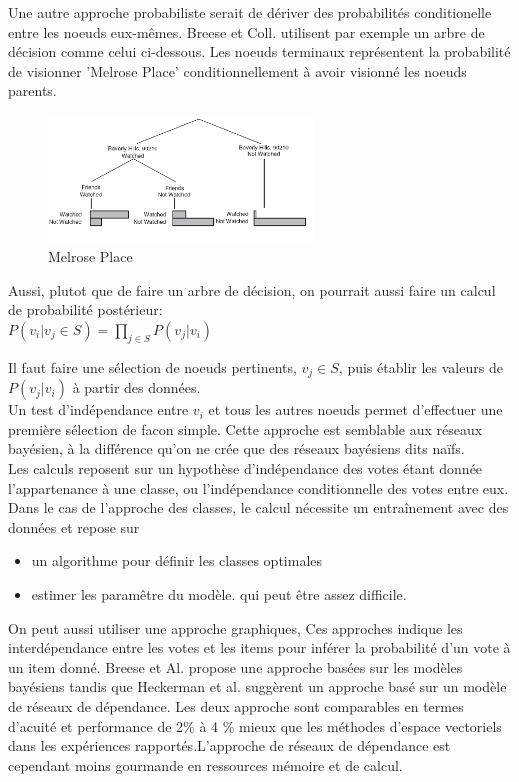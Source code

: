 \documentclass[oneside]{book}
\begin{document}
Une autre approche probabiliste serait de dériver des probabilités conditionelle entre les noeuds eux-mêmes. Breese et Coll. utilisent par exemple un arbre de décision comme celui ci-dessous. Les noeuds terminaux représentent la probabilité de visionner 'Melrose Place' conditionnellement à avoir visionné les noeuds parents.\\

\begin{figure}[!ht]
\centering
\includegraphics[width = 7cm]{decision_tree.png}
\caption{Melrose Place}
\label{fig:decision_tree}
\end{figure}

Aussi, plutot que de faire un arbre de décision, on pourrait aussi faire un calcul de probabilité postérieur:\\

\centering
$P(v_i|v_j\in S) = \prod\limits_{j\in S} P(v_j|v_i)$
\justify

Il faut faire une sélection de noeuds pertinents, $v_j \in S$, puis établir les valeurs de $P(v_j|v_i)$ à partir des données.\\

Un test d'indépendance entre $v_i$ et tous les autres noeuds permet d'effectuer une première sélection de facon simple. Cette approche est semblable aux réseaux bayésien, à la différence qu'on ne crée que des réseaux bayésiens dits naïfs.\\

Les calculs reposent sur un hypothèse d'indépendance des votes étant donnée l'appartenance à une classe, ou l'indépendance conditionnelle des votes entre eux. Dans le cas de l'approche des classes, le calcul nécessite un entraînement avec des données et repose sur 
\begin{itemize}
\item un algorithme pour définir les classes optimales
\item estimer les paramêtre du modèle. qui peut être assez difficile.
\end{itemize}

On peut aussi utiliser une approche graphiques, Ces approches indique les interdépendance entre les votes et les items pour inférer la probabilité d'un vote à un item donné. Breese et Al. propose une approche basées sur les modèles bayésiens tandis que Heckerman et al. suggèrent un approche basé sur un modèle de réseaux de dépendance. Les deux approche sont comparables en termes d'acuité et performance de 2\% à 4 \% mieux que les méthodes d'espace vectoriels dans les expériences rapportés.L’approche de
réseaux de dépendance est cependant moins gourmande en
ressources mémoire et de calcul.
\end{document}
